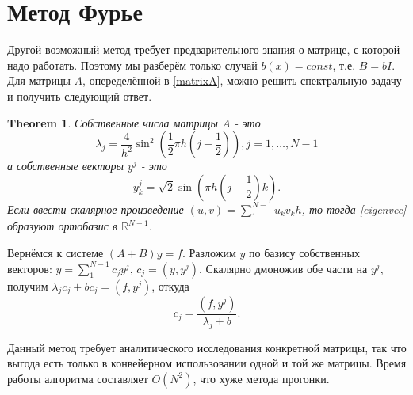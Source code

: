 \documentclass[12 pt, russian]{article}
\def\bbr{{\mathbb R}}
\newtheorem{theo}{Theorem}[section]
\newcommand\beq{\begin{equation}}
\newcommand\eeq{\end{equation}}
\begin{document}
\section{Метод Фурье}
\label{four}

Другой возможный метод требует предварительного знания о матрице, с которой надо работать. Поэтому мы разберём только случай $b(x) = const$, т.е. $B = bI$.
Для матрицы $A$, опеределённой в \eqref{matrixA}, можно решить спектральную задачу и получить следующий ответ. 
\begin{theo}
\label{spec}
Собственные числа матрицы $A$ - это 
\beq
\label{eigenval}
\lambda_j = \frac{4}{h^2} \sin^2(\frac{1}{2} \pi h (j - \frac{1}{2})), j = 1, \dots, N-1
\eeq
а собственные векторы $y^j$ - это 
\beq
\label{eigenvec}
y^j_k = \sqrt{2} \sin(\pi h (j - \frac{1}{2})k).
\eeq
Если ввести скалярное произведение $(u, v) = \sum_1^{N-1} u_k v_k h$, то тогда \eqref{eigenvec} образуют ортобазис в $\bbr^{N-1}$.
\end{theo}

Вернёмся к системе $(A+B)y = f$. Разложим $y$ по базису собственных векторов: $y = \sum_1^{N-1} c_j y^j$, $c_j = (y, y^j)$. Скалярно дмоножив обе части на $y^j$, получим $\lambda_j  c_j+ b c_j = (f, y^j)$, откуда 
\beq
c_j = \frac{(f, y^j)}{\lambda_j + b}.
\eeq 

Данный метод требует аналитического исследования конкретной матрицы, так что выгода есть только в конвейерном использовании одной и той же матрицы. Время работы алгоритма составляет $O(N^2)$, что хуже метода прогонки.
\end{document}
